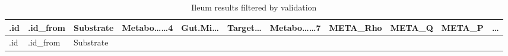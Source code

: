 \documentclass[
]{article}
\begin{document}
\begin{longtable}[]{@{}lllllllllll@{}}
\caption{\label{tab:Ileum-results-filtered-by-validation}Ileum results filtered by validation}\tabularnewline
\toprule
\begin{minipage}[b]{0.05\columnwidth}\raggedright
.id\strut
\end{minipage} & \begin{minipage}[b]{0.07\columnwidth}\raggedright
.id\_from\strut
\end{minipage} & \begin{minipage}[b]{0.07\columnwidth}\raggedright
Substrate\strut
\end{minipage} & \begin{minipage}[b]{0.09\columnwidth}\raggedright
Metabo\ldots\ldots4\strut
\end{minipage} & \begin{minipage}[b]{0.07\columnwidth}\raggedright
Gut.Mi\ldots{}\strut
\end{minipage} & \begin{minipage}[b]{0.07\columnwidth}\raggedright
Target\ldots{}\strut
\end{minipage} & \begin{minipage}[b]{0.09\columnwidth}\raggedright
Metabo\ldots\ldots7\strut
\end{minipage} & \begin{minipage}[b]{0.07\columnwidth}\raggedright
META\_Rho\strut
\end{minipage} & \begin{minipage}[b]{0.07\columnwidth}\raggedright
META\_Q\strut
\end{minipage} & \begin{minipage}[b]{0.07\columnwidth}\raggedright
META\_P\strut
\end{minipage} & \begin{minipage}[b]{0.03\columnwidth}\raggedright
\ldots{}\strut
\end{minipage}\tabularnewline
\midrule
\endfirsthead
\toprule
\begin{minipage}[b]{0.05\columnwidth}\raggedright
.id\strut
\end{minipage} & \begin{minipage}[b]{0.07\columnwidth}\raggedright
.id\_from\strut
\end{minipage} & \begin{minipage}[b]{0.07\columnwidth}\raggedright
Substrate\strut
\end{minipage} & \begin{minipage}[b]{0.09\columnwidth}\raggedright

\end{minipage}
\end{longtable}
\end{document}
